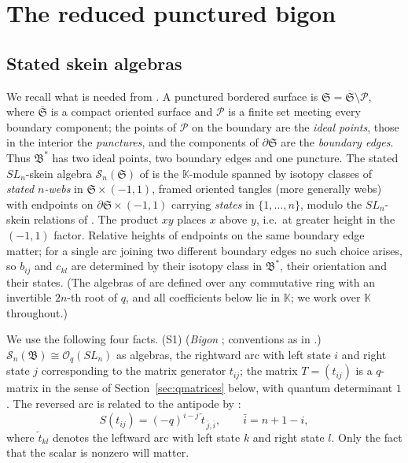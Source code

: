 \documentclass[11pt]{article}
\theoremstyle{remark}
\newcommand{\kk}{\mathbb K}
\newcommand{\Skein}{\mathcal S_n}
\newcommand{\Bstar}{\mathfrak B^*}
\newcommand{\Bigon}{\mathfrak B}
\newcommand{\Oq}{\mathcal O_q(SL_n)}
\begin{document}
\section{The reduced punctured bigon}\label{sec:skein}

\subsection{Stated skein algebras}\label{sec:statedskein}

We recall what is needed from \cite{LS,LY}. A punctured bordered
surface is $\mathfrak S=\overline{\mathfrak S}\setminus\mathcal P$,
where $\overline{\mathfrak S}$ is a compact oriented surface and
$\mathcal P$ is a finite set meeting every boundary component; the
points of $\mathcal P$ on the boundary are the \emph{ideal points},
those in the interior the \emph{punctures}, and the components of
$\partial\mathfrak S$ are the \emph{boundary edges}. Thus $\Bstar$ has
two ideal points, two boundary edges and one puncture. The stated $SL_n$-skein
algebra $\Skein(\mathfrak S)$ of \cite{LS} is the $\kk$-module spanned
by isotopy classes of \emph{stated $n$-webs} in
$\mathfrak S\times(-1,1)$, framed oriented tangles (more generally
webs) with endpoints on $\partial\mathfrak S\times(-1,1)$ carrying
\emph{states} in $\{1,\dots,n\}$, modulo the $SL_n$-skein relations of
\cite{LS}. The product $xy$ places $x$ above $y$, i.e.\ at
greater height in the $(-1,1)$ factor. Relative heights of endpoints on
the same boundary edge matter; for a single arc joining two different
boundary edges no such choice arises, so $b_{ij}$ and $c_{kl}$ are
determined by their isotopy class in $\Bstar$, their orientation and
their states. (The algebras of \cite{LS} are defined over any
commutative ring with an invertible $2n$-th root of $q$, and all
coefficients below lie in $\kk$; we work over $\kk$ throughout.)

We use the following four facts.
\noindent(S1) (\emph{Bigon} \cite[Theorem 6.3]{LS}; conventions as in
\cite[Sections 3.1 and 4.7]{LY}.) $\Skein(\Bigon)\cong\Oq$ as algebras,
the rightward arc with left state $i$ and right state $j$ corresponding
to the matrix generator $t_{ij}$; the matrix $T=(t_{ij})$ is a
$q$-matrix in the sense of Section~\ref{sec:qmatrices} below, with
quantum determinant $1$. The reversed arc is related to the antipode
by \cite[equation (83)]{LY}:
\begin{equation}\label{eq:antipode}
 S(t_{ij})=(-q)^{i-j}\,\overleftarrow{t}_{\,\bar j,\bar i},
 \qquad\bar i=n+1-i,
\end{equation}
where $\overleftarrow t_{kl}$ denotes the leftward arc with left state
$k$ and right state $l$. Only the fact that the scalar is nonzero will
matter.
\end{document}
